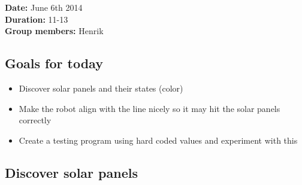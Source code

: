 \textbf{Date:} June 6th 2014\\\textbf{Duration:} 11-13\\\textbf{Group
members:} Henrik

\subsection{Goals for today}

\begin{itemize}
\item
  Discover solar panels and their states (color)
\item
  Make the robot align with the line nicely so it may hit the solar
  panels correctly
\item
  Create a testing program using hard coded values and experiment with
  this
\end{itemize}

\subsection{Discover solar panels}

